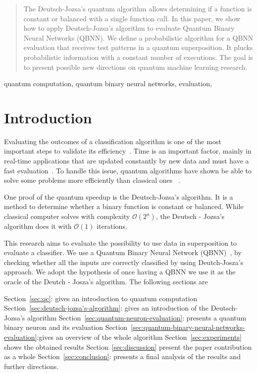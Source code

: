 \documentclass[conference]{IEEEtran}
\begin{document}
\begin{abstract}
The Deutsch-Jozsa's quantum algorithm allows determining if a function is constant or balanced with a single function call.
In this paper, we show how to apply Deutsch-Jozsa's algorithm to evaluate Quantum Binary Neural Networks (QBNN).
We define a probabilistic algorithm for a QBNN evaluation that receives test patterns in a quantum superposition.
It plucks probabilistic information with a constant number of executions.
The goal is to present possible new directions on quantum machine learning research.
\end{abstract}

\begin{IEEEkeywords}
quantum computation, quantum binary neural networks, evaluation,
\end{IEEEkeywords}

\section{Introduction}\label{sec:introduction}
Evaluating the outcomes of a classification algorithm is one of the most important steps to validate its
efficiency~\cite{japkowicz2006question}.
Time is an important factor, mainly in
real-time applications that are updated constantly by new data and must have a fast evaluation~\cite{chen2012classifier}.
To handle this issue, quantum algorithms have shown be able to solve some problems more efficiently than classical ones
~\cite{deutsch1992rapid}.

One proof of the quantum speedup is the Deutsch-Jozsa's algorithm.
It is a method to determine whether a binary function is constant or balanced.
While classical computer solves with complexity \(\mathcal{O}(2^{n})\),
the Deutsch - Jozsa's algorithm does it with \(\mathcal{O}(1)\) iterations.

This research aims to evaluate the possibility to use data in superposition to evaluate a classifier.
We use a Quantum Binary Neural Network (QBNN)~\cite{fawaz2019training}, by checking whether all the inputs are correctly
classified by using Deutch-Josza's approach.
We adopt the hypothesis of once having a QBNN we use it as the oracle of the Deutch - Josza's algorithm.
The following sections are

Section~\ref{sec:qc}: gives an introduction to quantum computation
Section~\ref{sec:deutsch-jozsa's-algorithm}: gives an introduction of the Deutsch-Jozsa's algorithm
Section~\ref{sec:quantum-neuron-evaluation}: presents a quantum binary neuron and its evaluation
Section~\ref{sec:quantum-binary-neural-networks-evaluation}:gives an overview of the whole algorithm
Section~\ref{sec:experiments} shows the obtained results
Section~\ref{sec:discussion} present the paper contribution as a whole
Section~\ref{sec:conclusion}: presents a final analysis of the results and further directions.
\end{document}
